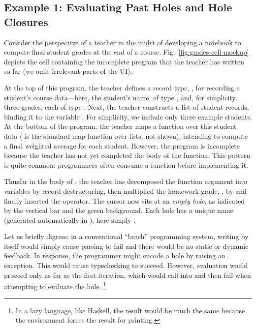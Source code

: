 
\subsection{Example 1: Evaluating Past Holes and Hole Closures}

Consider the perspective of a teacher in the midst of developing a \Hazel{} notebook
to compute final student grades at the end of a course.
Fig.~\ref{fig:grades-cell-mockup} depicts the cell containing the incomplete program that 
the teacher has written so far (we omit irrelevant parts of the UI). 
%

At the top of this program, the teacher defines a
record type, , for recording a student's course data---here,
the student's name, of type
, and, for simplicity, three grades, each of type . Next, the teacher constructs a list of student records, binding it to the variable . For simplicity, we include only three example students.
At the bottom of the program, the teacher maps a function  over this student data ( is the standard map function over lists, not shown), intending to compute a final weighted average for each student.
However, the program is incomplete because the teacher has not yet completed the body of the  function. This pattern is quite common: programmers often consume a function before implementing it.

Thusfar in the body of , the teacher has decomposed the function argument into variables by record destructuring, then multiplied the homework grade, , by  and finally inserted the \li{+} operator. The cursor now sits at an \emph{empty hole}, as indicated by the vertical bar and the green background. Each hole has a unique name (generated automatically in \Hazel), here simply . 

Let us briefly digress: in a conventional ``batch'' programming system, writing  by itself would simply cause parsing to fail and there would be no static or dynamic feedback.
In response, the programmer might encode a hole by raising an exception. This would cause typechecking to succeed. 
However, 
evaluation would proceed only as far as the first  iteration, 
which would call into  and then fail when attempting to evaluate the hole.%
\footnote{In a lazy language, like Haskell, the result would be much the same because the environment forces the result for printing.}

